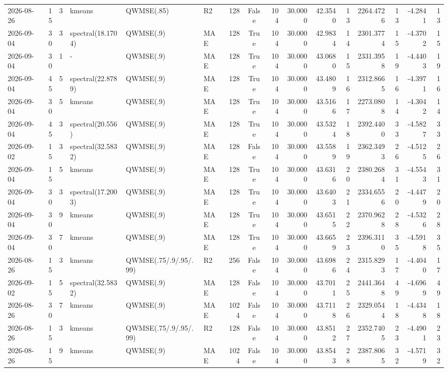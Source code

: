 \documentclass[10pt]{article}
\begin{document}
\begin{landscape}
\begin{longtable}{@{}lrrlllrcrrrrrrrr@{}}
2026-08-26 & 15 & 3 & kmeans & QWMSE(.85) & R2 & 128 & False & 104 & 30.0000 & 42.3540 & 13 & 2264.4726 & 13 & -4.2841 & 13 \\
2026-09-04 & 30 & 3 & spectral(18.1704) & QWMSE(.9) & MAE & 128 & True & 104 & 30.0000 & 42.9834 & 14 & 2301.3774 & 15 & -4.3702 & 15 \\
2026-09-04 & 30 & 1 & - & QWMSE(.9) & MAE & 128 & True & 104 & 30.0000 & 43.0680 & 15 & 2331.3958 & 19 & -4.4403 & 19 \\
2026-09-04 & 45 & 5 & spectral(22.8789) & QWMSE(.9) & MAE & 128 & True & 104 & 30.0000 & 43.4809 & 16 & 2312.8665 & 16 & -4.3971 & 16 \\
2026-09-04 & 30 & 5 & kmeans & QWMSE(.9) & MAE & 128 & True & 104 & 30.0000 & 43.5166 & 17 & 2273.0808 & 14 & -4.3042 & 14 \\
2026-09-04 & 45 & 3 & spectral(20.556) & QWMSE(.9) & MAE & 128 & True & 104 & 30.0000 & 43.5324 & 18 & 2392.4400 & 33 & -4.5827 & 33 \\
2026-09-02 & 15 & 3 & spectral(32.5832) & QWMSE(.9) & MAE & 128 & False & 104 & 30.0000 & 43.5589 & 19 & 2362.3493 & 26 & -4.5125 & 26 \\
2026-09-04 & 15 & 5 & kmeans & QWMSE(.9) & MAE & 128 & True & 104 & 30.0000 & 43.6316 & 20 & 2380.2684 & 31 & -4.5543 & 31 \\
2026-09-04 & 30 & 3 & spectral(17.2003) & QWMSE(.9) & MAE & 128 & True & 104 & 30.0000 & 43.6403 & 21 & 2334.6556 & 20 & -4.4479 & 20 \\
2026-09-04 & 30 & 9 & kmeans & QWMSE(.9) & MAE & 128 & True & 104 & 30.0000 & 43.6515 & 22 & 2370.9628 & 28 & -4.5326 & 28 \\
2026-09-04 & 30 & 7 & kmeans & QWMSE(.9) & MAE & 128 & True & 104 & 30.0000 & 43.6659 & 23 & 2396.3110 & 35 & -4.5918 & 35 \\
2026-08-26 & 15 & 3 & kmeans & QWMSE(.75/.9/.95/.99) & R2 & 256 & False & 104 & 30.0000 & 43.6986 & 24 & 2315.8293 & 17 & -4.4040 & 17 \\
2026-09-02 & 15 & 5 & spectral(32.5832) & QWMSE(.9) & MAE & 128 & False & 104 & 30.0000 & 43.7011 & 25 & 2441.3648 & 49 & -4.6969 & 49 \\
2026-08-26 & 30 & 7 & kmeans & QWMSE(.9) & MAE & 1024 & False & 104 & 30.0000 & 43.7118 & 26 & 2329.0544 & 18 & -4.4348 & 18 \\
2026-08-26 & 15 & 3 & kmeans & QWMSE(.75/.9/.95/.99) & R2 & 128 & False & 104 & 30.0000 & 43.8512 & 27 & 2352.7405 & 23 & -4.4901 & 23 \\
2026-08-26 & 15 & 9 & kmeans & QWMSE(.9) & MAE & 1024 & False & 104 & 30.0000 & 43.8543 & 28 & 2387.8065 & 32 & -4.5719 & 32 \\

\end{longtable}
\end{landscape}
\end{document}
